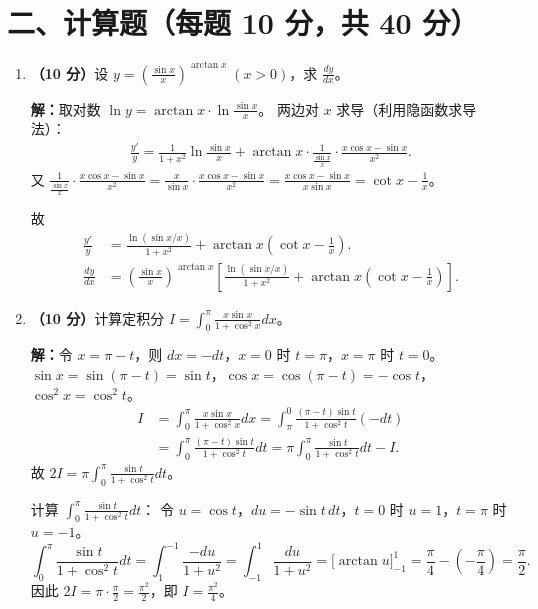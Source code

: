 \documentclass[12pt,a4paper]{ctexart}
\begin{document}
\section*{二、计算题（每题 10 分，共 40 分）}

\begin{enumerate}[leftmargin=*,label=\arabic*.,start=5]
  \item \textbf{（10 分）}设 $y = \left(\frac{\sin x}{x}\right)^{\arctan x}\;(x>0)$，求 $\frac{dy}{dx}$。

    \textbf{解：}取对数 $\ln y = \arctan x \cdot \ln\frac{\sin x}{x}$。
    两边对 $x$ 求导（利用隐函数求导法）：
    \begin{align*}
      \frac{y'}{y} = \frac{1}{1+x^2}\ln\frac{\sin x}{x}
      + \arctan x \cdot \frac{1}{\frac{\sin x}{x}} \cdot
      \frac{x\cos x - \sin x}{x^2}.
    \end{align*}
    又 $\frac{1}{\frac{\sin x}{x}} \cdot \frac{x\cos x - \sin x}{x^2}
    = \frac{x}{\sin x} \cdot \frac{x\cos x - \sin x}{x^2}
    = \frac{x\cos x - \sin x}{x\sin x} = \cot x - \frac{1}{x}$。

    故
    \begin{align*}
      \frac{y'}{y} &= \frac{\ln(\sin x/x)}{1+x^2}
      + \arctan x\left(\cot x - \frac{1}{x}\right). \\[4pt]
      \frac{dy}{dx}
      &= \left(\frac{\sin x}{x}\right)^{\arctan x}
        \left[\frac{\ln(\sin x/x)}{1+x^2}
        + \arctan x\left(\cot x - \frac{1}{x}\right)\right].
    \end{align*}

  \item \textbf{（10 分）}计算定积分 $I = \displaystyle\int_0^{\pi} \frac{x\sin x}{1+\cos^2 x} dx$。

    \textbf{解：}令 $x = \pi - t$，则 $dx = -dt$，$x=0$ 时 $t=\pi$，$x=\pi$ 时 $t=0$。
    $\sin x = \sin(\pi-t) = \sin t$，$\cos x = \cos(\pi-t) = -\cos t$，
    $\cos^2 x = \cos^2 t$。
    \begin{align*}
      I &= \int_0^{\pi} \frac{x\sin x}{1+\cos^2 x} dx
         = \int_{\pi}^0 \frac{(\pi-t)\sin t}{1+\cos^2 t} (-dt) \\
        &= \int_0^{\pi} \frac{(\pi-t)\sin t}{1+\cos^2 t} dt
         = \pi\int_0^{\pi} \frac{\sin t}{1+\cos^2 t} dt - I.
    \end{align*}
    故 $2I = \pi\int_0^{\pi} \frac{\sin t}{1+\cos^2 t} dt$。

    计算 $\int_0^{\pi} \frac{\sin t}{1+\cos^2 t} dt$：
    令 $u = \cos t$，$du = -\sin t\,dt$，$t=0$ 时 $u=1$，$t=\pi$ 时 $u=-1$。
    \[
    \int_0^{\pi} \frac{\sin t}{1+\cos^2 t} dt
    = \int_1^{-1} \frac{-du}{1+u^2}
    = \int_{-1}^1 \frac{du}{1+u^2}
    = \bigl[\arctan u\bigr]_{-1}^1
    = \frac{\pi}{4} - \left(-\frac{\pi}{4}\right)
    = \frac{\pi}{2}.
    \]
    因此 $2I = \pi \cdot \frac{\pi}{2} = \frac{\pi^2}{2}$，即 $I = \frac{\pi^2}{4}$。


\end{enumerate}
\end{document}
